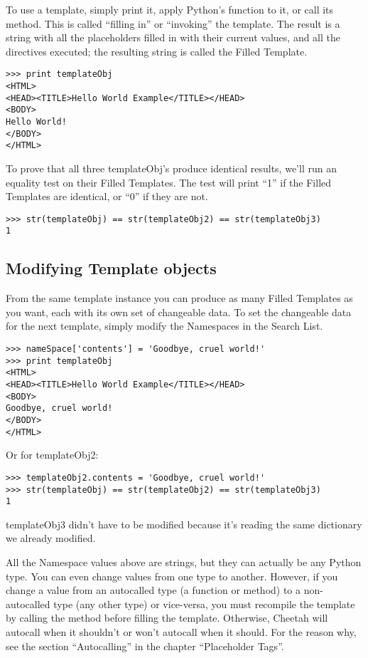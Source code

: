 To use a template, simply print it, apply Python's
 function to it, or call its  method.  This is
called ``filling in'' or ``invoking'' the template.  The result is a string
with all the placeholders filled in with their current values, and all the
directives executed; the resulting string is called the Filled Template.

\begin{verbatim}
>>> print templateObj
<HTML>
<HEAD><TITLE>Hello World Example</TITLE></HEAD>
<BODY>
Hello World!
</BODY>
</HTML>
\end{verbatim}

To prove that all three templateObj's produce identical results, we'll run an
equality test on their Filled Templates.  The test will print ``1'' if the
Filled Templates are identical, or ``0'' if they are not.

\begin{verbatim}
>>> str(templateObj) == str(templateObj2) == str(templateObj3)
1
\end{verbatim}


\subsection{Modifying Template objects}

From the same template instance you can produce as many Filled Templates as you
want, each with its own set of changeable data.  To set the changeable data for
the next template, simply modify the Namespaces in the Search List.

\begin{verbatim}
>>> nameSpace['contents'] = 'Goodbye, cruel world!'
>>> print templateObj
<HTML>
<HEAD><TITLE>Hello World Example</TITLE></HEAD>
<BODY>
Goodbye, cruel world!
</BODY>
</HTML>
\end{verbatim}

Or for templateObj2:

\begin{verbatim}
>>> templateObj2.contents = 'Goodbye, cruel world!'
>>> str(templateObj) == str(templateObj2) == str(templateObj3)
1
\end{verbatim}

templateObj3 didn't have to be modified because it's reading the same
 dictionary we already modified.  

All the Namespace values above are strings, but they can actually be any Python
type.  You can even change values from one type to another.  However, if you
change a value from an autocalled type (a function or method) to a
non-autocalled type (any other type) or vice-versa, you must recompile the
template by calling the  method before
filling the template.  Otherwise, Cheetah will autocall when it shouldn't or
won't autocall when it should.  For the reason why, see the section
``Autocalling'' in the chapter ``Placeholder Tags''.


